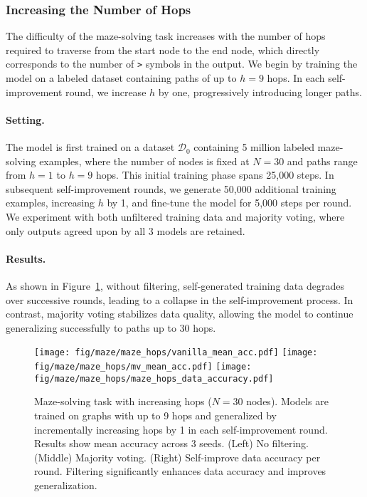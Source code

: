 \subsubsection{Increasing the Number of Hops}
The difficulty of the maze-solving task increases with the number of hops required to traverse from the start node to the end node, which directly corresponds to the number of \texttt{>} symbols in the output. We begin by training the model on a labeled dataset containing paths of up to \( h=9 \) hops. In each self-improvement round, we increase \( h \) by one, progressively introducing longer paths.

\paragraph{Setting.}
The model is first trained on a dataset \( \mathcal{D}_0 \) containing 5 million labeled maze-solving examples, where the number of nodes is fixed at \( N=30 \) and paths range from \( h=1 \) to \( h=9 \) hops. This initial training phase spans 25,000 steps. In subsequent self-improvement rounds, we generate 50,000 additional training examples, increasing \( h \) by 1, and fine-tune the model for 5,000 steps per round. We experiment with both unfiltered training data and majority voting, where only outputs agreed upon by all 3 models are retained.

\paragraph{Results.}
As shown in Figure~\ref{fig:maze_hops_len_gen_result}, without filtering, self-generated training data degrades over successive rounds, leading to a collapse in the self-improvement process. In contrast, majority voting stabilizes data quality, allowing the model to continue generalizing successfully to paths up to 30 hops.

\begin{figure}
    \centering
    \texttt{[image: fig/maze/maze\_hops/vanilla\_mean\_acc.pdf]}
    \hspace{1mm}
    \texttt{[image: fig/maze/maze\_hops/mv\_mean\_acc.pdf]}
    \hspace{1mm}
    \texttt{[image: fig/maze/maze\_hops/maze\_hops\_data\_accuracy.pdf]}
    \caption{Maze-solving task with increasing hops (\( N=30 \) nodes). Models are trained on graphs with up to 9 hops and generalized by incrementally increasing hops by 1 in each self-improvement round. Results show mean accuracy across 3 seeds. (Left) No filtering. (Middle) Majority voting. (Right) Self-improve data accuracy per round. Filtering significantly enhances data accuracy and improves generalization.}
    \label{fig:maze_hops_len_gen_result}
\end{figure}




